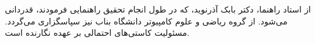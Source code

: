 
از استاد راهنما، دکتر بابک آذرنوید، که در طول انجام تحقیق راهنمایی فرمودند، قدردانی می‌شود. از گروه ریاضی و علوم کامپیوتر دانشگاه بناب نیز سپاسگزاری می‌گردد. مسئولیت کاستی‌های احتمالی بر عهده نگارنده است.
\vfill
